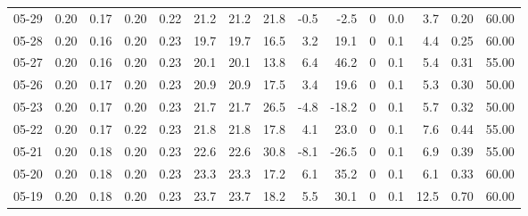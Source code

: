 \begin{threeparttable}
{\begin{tabular}{lrrrrrrrrrrrrrr}
  05-29 &          0.20 &          0.17 &          0.20 &        0.22 &                21.2 &               21.2 &                21.8 &       -0.5 &         -2.5 &              0 &                 0.0 &              3.7 &            0.20 &                  60.00 \\
  05-28 &          0.20 &          0.16 &          0.20 &        0.23 &                19.7 &               19.7 &                16.5 &        3.2 &         19.1 &              0 &                 0.1 &              4.4 &            0.25 &                  60.00 \\
  05-27 &          0.20 &          0.16 &          0.20 &        0.23 &                20.1 &               20.1 &                13.8 &        6.4 &         46.2 &              0 &                 0.1 &              5.4 &            0.31 &                  55.00 \\
  05-26 &          0.20 &          0.17 &          0.20 &        0.23 &                20.9 &               20.9 &                17.5 &        3.4 &         19.6 &              0 &                 0.1 &              5.3 &            0.30 &                  50.00 \\
  05-23 &          0.20 &          0.17 &          0.20 &        0.23 &                21.7 &               21.7 &                26.5 &       -4.8 &        -18.2 &              0 &                 0.1 &              5.7 &            0.32 &                  50.00 \\
  05-22 &          0.20 &          0.17 &          0.22 &        0.23 &                21.8 &               21.8 &                17.8 &        4.1 &         23.0 &              0 &                 0.1 &              7.6 &            0.44 &                  55.00 \\
  05-21 &          0.20 &          0.18 &          0.20 &        0.23 &                22.6 &               22.6 &                30.8 &       -8.1 &        -26.5 &              0 &                 0.1 &              6.9 &            0.39 &                  55.00 \\
  05-20 &          0.20 &          0.18 &          0.20 &        0.23 &                23.3 &               23.3 &                17.2 &        6.1 &         35.2 &              0 &                 0.1 &              6.1 &            0.33 &                  60.00 \\
  05-19 &          0.20 &          0.18 &          0.20 &        0.23 &                23.7 &               23.7 &                18.2 &        5.5 &         30.1 &              0 &                 0.1 &             12.5 &            0.70 &                  60.00 \\

\end{tabular}}
\end{threeparttable}
